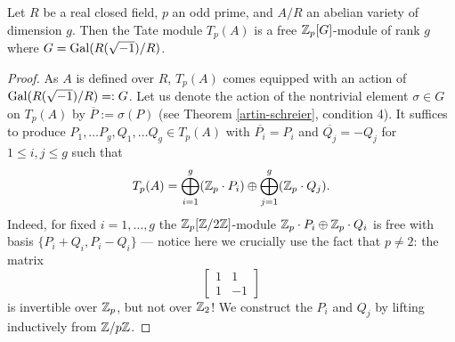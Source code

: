 \begin{corollary}
Let $R$ be a real closed field, $p$ an odd prime, and $A/R$ an abelian variety of dimension $g$. Then the Tate module $T_p(A)$ is a free $\mathbb{Z}_p[G]$-module of rank $g$ where $G=\operatorname{Gal}(R(\sqrt{-1})/R)$.
\end{corollary}
\begin{proof}
As $A$ is defined over $R$, $T_p(A)$ comes equipped with an action of $\operatorname{Gal}(R(\sqrt{-1})/R)=:G$. Let us denote the action of the nontrivial element $\sigma\in G$ on $T_p(A)$ by $\overline{P}:=\sigma(P)$ (see Theorem \ref{artin-schreier}, condition 4). It suffices to produce $P_1,\dots P_g, Q_1,\dots Q_g\in T_p(A)$ with $\overline{P_i}=P_i$ and $\overline{Q_j}=-Q_j$ for $1\leq i,j\leq g$ such that $$T_p(A)=\bigoplus_{i=1}^g (\mathbb{Z}_p\cdot P_i)\oplus\bigoplus_{j=1}^g (\mathbb{Z}_p\cdot Q_j).$$ Indeed, for fixed $i=1,\dots,g$ the $\mathbb{Z}_p[\mathbb{Z}/2\mathbb{Z}]$-module $\mathbb{Z}_p\cdot P_i\oplus\mathbb{Z}_p \cdot Q_i$ is free with basis $\{P_i+Q_i,P_i-Q_i\}$ --- notice here we crucially use the fact that $p\neq 2$: the matrix 
$$\begin{bmatrix} 
1 & 1\\
1 & -1
\end{bmatrix}$$
is invertible over $\mathbb{Z}_p$, but not over $\mathbb{Z}_2$! We construct the $P_i$ and $Q_j$ by lifting inductively from $\mathbb{Z}/p\mathbb{Z}$. 


\end{proof}
